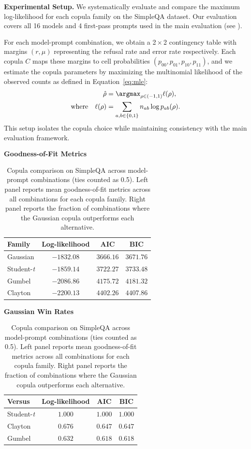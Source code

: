 \documentclass{article} %
\theoremstyle{definition}
\begin{document}
\noindent\textbf{Experimental Setup.}
We systematically evaluate and compare the maximum log-likelihood for each copula family on the SimpleQA dataset. Our evaluation covers all 16 models and 4 first-pass prompts used in the main evaluation (see ).

For each model-prompt combination, we obtain a 2\,$\times$\,2 contingency table with margins $(r,\mu)$ representing the refusal rate and error rate respectively. Each copula $C$ maps these margins to cell probabilities $(p_{00},p_{01},p_{10},p_{11})$, and we estimate the copula parameters by maximizing the multinomial likelihood of the observed counts as defined in Equation~\ref{eq:mle}:
\begin{align}
\hat{\rho} &= \argmax_{\rho \in (-1,1)} \ell(\rho), \nonumber\\
\text{where} \quad \ell(\rho) &= \sum_{a,b\in\{0,1\}} n_{ab} \log p_{ab}(\rho). \label{eq:mle}
\end{align}
This setup isolates the copula choice while maintaining consistency with the main evaluation framework.

\begin{table}[t]
  \centering
  \small
  \caption{Copula comparison on SimpleQA across model-prompt combinations (ties counted as 0.5). Left panel reports mean goodness-of-fit metrics across all combinations for each copula family. Right panel reports the fraction of combinations where the Gaussian copula outperforms each alternative.}
  \label{tab:copula_comparison}
  \begin{minipage}[t]{0.48\textwidth}
    \centering
    \textbf{Goodness-of-Fit Metrics}
    \begin{tabular}{@{}lccc@{}}
      \toprule
      Family & Log-likelihood & AIC & BIC \\
      \midrule
      Gaussian & $-1832.08$ & $3666.16$ & $3671.76$ \\
      Student-\emph{t} & $-1859.14$ & $3722.27$ & $3733.48$ \\
      Gumbel & $-2086.86$ & $4175.72$ & $4181.32$ \\
      Clayton & $-2200.13$ & $4402.26$ & $4407.86$ \\
      \bottomrule
    \end{tabular}
  \end{minipage}
  \hfill
  \begin{minipage}[t]{0.48\textwidth}
    \centering
    \textbf{Gaussian Win Rates}
    \begin{tabular}{@{}lccc@{}}
      \toprule
      Versus & Log-likelihood & AIC & BIC \\
      \midrule
      Student-\emph{t} & $1.000$ & $1.000$ & $1.000$ \\
      Clayton & $0.676$ & $0.647$ & $0.647$ \\
      Gumbel & $0.632$ & $0.618$ & $0.618$ \\
      \bottomrule
    \end{tabular}
  \end{minipage}
\end{table}
\end{document}
